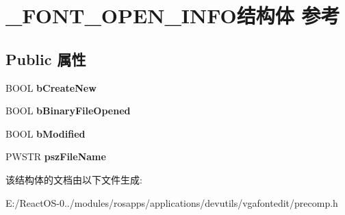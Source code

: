 \hypertarget{struct___f_o_n_t___o_p_e_n___i_n_f_o}{}\section{\+\_\+\+F\+O\+N\+T\+\_\+\+O\+P\+E\+N\+\_\+\+I\+N\+F\+O结构体 参考}
\label{struct___f_o_n_t___o_p_e_n___i_n_f_o}
\subsection*{Public 属性}
\begin{DoxyCompactItemize}
\item 
\mbox{\label{struct___f_o_n_t___o_p_e_n___i_n_f_o_ac1a7cbbfaddfc895c0fbf385f503719a}} 
B\+O\+OL {\bfseries b\+Create\+New}
\item 
\mbox{\label{struct___f_o_n_t___o_p_e_n___i_n_f_o_a13a098c30b556fef36a98a9f3dfa99fd}} 
B\+O\+OL {\bfseries b\+Binary\+File\+Opened}
\item 
\mbox{\label{struct___f_o_n_t___o_p_e_n___i_n_f_o_aa918c309a3182bb42f2cbf9320be21e4}} 
B\+O\+OL {\bfseries b\+Modified}
\item 
\mbox{\label{struct___f_o_n_t___o_p_e_n___i_n_f_o_a22f547566380e1f475d5608fa01815c6}} 
P\+W\+S\+TR {\bfseries psz\+File\+Name}
\end{DoxyCompactItemize}


该结构体的文档由以下文件生成\+:\begin{DoxyCompactItemize}
\item 
E\+:/\+React\+O\+S-\/0../modules/rosapps/applications/devutils/vgafontedit/precomp.\+h\end{DoxyCompactItemize}
